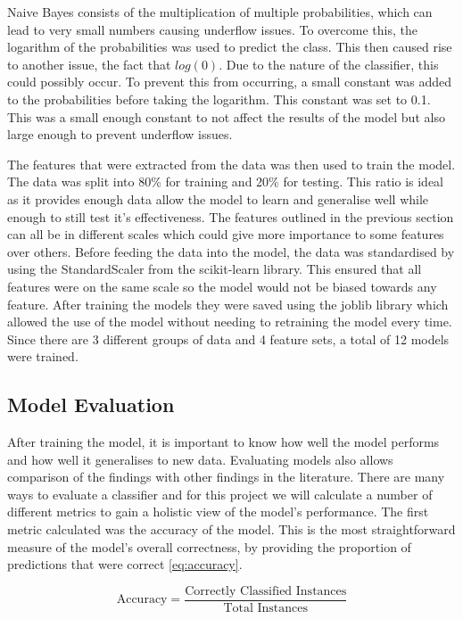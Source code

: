Naive Bayes consists of the multiplication of multiple probabilities, which can lead to very small numbers causing underflow issues. To overcome this, the logarithm of the probabilities was used to predict the class. This then caused rise to another issue, the fact that $log(0)$. Due to the nature of the classifier, this could possibly occur. To prevent this from occurring, a small constant was added to the probabilities before taking the logarithm. This constant was set to 0.1. This was a small enough constant to not affect the results of the model but also large enough to prevent underflow issues.

The features that were extracted from the data was then used to train the model. The data was split into 80\% for training and 20\% for testing. This ratio is ideal as it provides enough data allow the model to learn and generalise well while enough to still test it's effectiveness. The features outlined in the previous section can all be in different scales which could give more importance to some features over others. Before feeding the data into the model, the data was standardised by using the StandardScaler from the scikit-learn library.  This ensured that all features were on the same scale so the model would not be biased towards any feature. After training the models they were saved using the joblib library which allowed the use of the model without needing to retraining the model every time. Since there are 3 different groups of data and 4 feature sets, a total of 12 models were trained. 

\subsection {Model Evaluation}

After training the model, it is important to know how well the model performs and how well it generalises to new data. Evaluating models also allows comparison of the findings with other findings in the literature. There are many ways to evaluate a classifier and for this project we will calculate a number of different metrics to gain a holistic view of the model's performance. The first metric calculated was the accuracy of the model. This is the most straightforward measure of the model's overall correctness, by providing the proportion of predictions that were correct \ref{eq:accuracy}.


\begin{equation}
    \label{eq:accuracy}
    \text{Accuracy} = \frac{\text{Correctly Classified Instances}}{\text{Total Instances}}
\end{equation}

